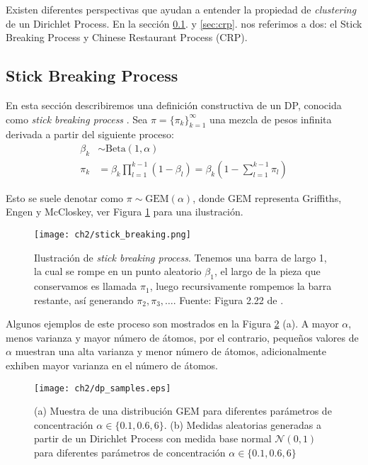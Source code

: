 \documentclass[letterpaper,12pt,oneside]{book} %
\begin{document}
Existen diferentes perspectivas que ayudan a entender la propiedad de \textit{clustering} de un Dirichlet Process. En la sección \ref{sec:sbp}. y \ref{sec:crp}. nos referimos a dos: el Stick Breaking Process y Chinese Restaurant Process (CRP).

\subsection{Stick Breaking Process}
\label{sec:sbp}

En esta sección describiremos una definición constructiva de un DP, conocida como \textit{stick breaking process} \citep{sethuraman1994constructive}. Sea $\pi=\{\pi_{k}\}_{k=1}^{\infty}$ una mezcla de pesos infinita derivada a partir del siguiente proceso:
\begin{align}
    \beta_{k} & \sim \text{Beta}(1, \alpha)\\
    \pi_{k} & = \beta_{k}\prod_{l=1}^{k-1}(1-\beta_{l}) = \beta_{k}(1-\sum_{l=1}^{k-1}\pi_{l})
\end{align}

Esto se suele denotar como $\pi \sim \text{GEM}(\alpha)$, donde GEM representa Griffiths, Engen y McCloskey, ver Figura  \ref{img:stick_breaking} para una ilustración. 

\begin{figure}
    \centering
    \texttt{[image: ch2/stick\_breaking.png]}
    \caption{Ilustración de \textit{stick breaking process}. Tenemos una barra de largo 1, la cual se rompe en un punto aleatorio $\beta_{1}$, el largo de la pieza que conservamos es llamada $\pi_{1}$, luego recursivamente rompemos la barra restante, así generando $\pi_{2}, \pi_{3}, \ldots$. Fuente: Figura 2.22 de \citep{sudderth2006graphical}.}
    \label{img:stick_breaking}
\end{figure}

Algunos ejemplos de este proceso son mostrados en la Figura \ref{img:dp_samples} (a). A mayor $\alpha$, menos varianza y mayor número de átomos, por el contrario, pequeños valores de $\alpha$ muestran una alta varianza y menor número de átomos, adicionalmente exhiben mayor varianza en el número de átomos.

\begin{figure}
    \centering
    \texttt{[image: ch2/dp\_samples.eps]}
    \caption{(a) Muestra de una distribución GEM para diferentes parámetros de concentración $\alpha\in \{0.1, 0.6, 6\}$. (b) Medidas aleatorias generadas a partir de un Dirichlet Process con medida base normal $\mathcal{N}(0,1)$ para diferentes parámetros de concentración $\alpha\in \{0.1, 0.6, 6\}$}
    \label{img:dp_samples}
\end{figure}
\end{document}
